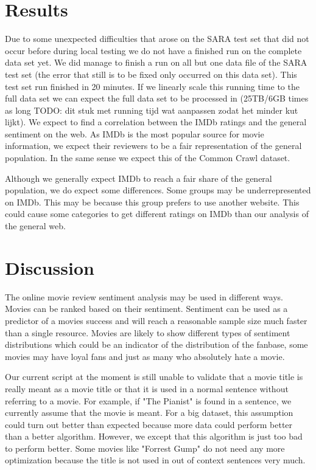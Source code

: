 \documentclass{sig-alternate-br}
\begin{document}
\section{Results}
Due to some unexpected difficulties that arose on the SARA test set that did not occur before during local testing we do not have a finished run on the complete data set yet. We did manage to finish a run on all but one data file of the SARA test set (the error that still is to be fixed only occurred on this data set). This test set run finished in 20 minutes. If we linearly scale this running time to the full data set we can expect the full data set to be processed in (25TB/6GB times as long TODO: dit stuk met running tijd wat aanpassen zodat het minder kut lijkt). We expect to find a correlation between the IMDb ratings and the general sentiment on the web. As IMDb is the most popular source for movie information, we expect their reviewers to be a fair representation of the general population. In the same sense we expect this of the Common Crawl dataset.



Although we generally expect IMDb to reach a fair share of the general population, we do expect some differences. Some groups may be underrepresented on IMDb. This may be because this group prefers to use another website. This could cause some categories to get different ratings on IMDb than our analysis of the general web.



\section{Discussion}
The online movie review sentiment analysis may be used in different ways. Movies can be ranked based on their sentiment. Sentiment can be used as a predictor of a movies success and will reach a reasonable sample size much faster than a single resource. 
Movies are likely to show different types of sentiment distributions which could be an indicator of the distribution of the fanbase, some movies may have loyal fans and just as many who absolutely hate a movie. 

Our current script at the moment is still unable to validate that a movie title is really meant as a movie title or that it is used in a normal sentence without referring to a movie. For example, if "The Pianist" is found in a sentence, we currently assume that the movie is meant. For a big dataset, this assumption could turn out better than expected because more data could perform better than a better algorithm. However, we except that this algorithm is just too bad to perform better. Some movies like "Forrest Gump" do not need any more optimization because the title is not used in out of context sentences very much.
\end{document}
